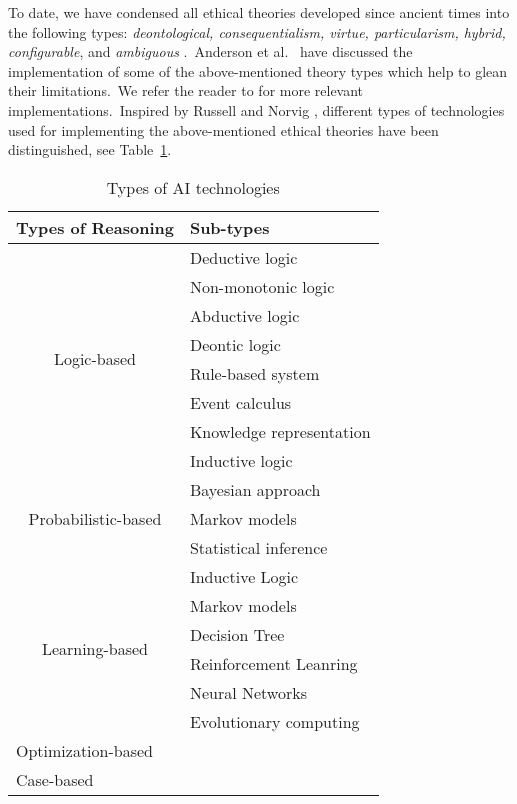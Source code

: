 To date, we have condensed all ethical theories developed since ancient times into the following types: \textit{deontological, consequentialism, virtue, particularism, hybrid, configurable}, and \textit{ambiguous} \cite{10.1145/3419633}.\ Anderson et al.\ \cite[pp.~20--22]{Anderson_Anderson_2007} have discussed the implementation of some of the above-mentioned theory types which help to glean their limitations.\ We refer the reader to \cite[p.~19]{10.1145/3419633} for more relevant implementations.\ Inspired by Russell and Norvig \cite{russell2016artificial}, different types of technologies used for implementing the above-mentioned ethical theories have been distinguished, see Table~\ref{tech_types}.

\begin{table}[htbp]
    \caption{Types of AI technologies}
    \label{tech_types}
    \scriptsize
    \centering
    \begin{tabular}{|c|l|}
        \hline
        \textbf{Types of Reasoning} & \textbf{Sub-types}   \\
        \hline
        \multirow{8}{*}{Logic-based} & Deductive logic \\
        & Non-monotonic logic\\
        & Abductive logic\\
        & Deontic logic\\
        & Rule-based system\\
        & Event calculus\\
        & Knowledge representation \\
        & Inductive logic\\
        
        \hline
        \multirow{3}{*}{Probabilistic-based} & Bayesian approach\\
        & Markov models\\
        & Statistical inference\\
        
        \hline
        \multirow{6}{*}{Learning-based} & Inductive Logic\\ 
        & Markov models\\
        & Decision Tree\\
        & Reinforcement Leanring \\
        & Neural Networks \\
        & Evolutionary computing \\
        
        \hline
        \multicolumn{2}{|l|}{Optimization-based}\\
        
        \hline 
        \multicolumn{2}{|l|}{Case-based} \\
        
        \hline
    \end{tabular}
\end{table}

